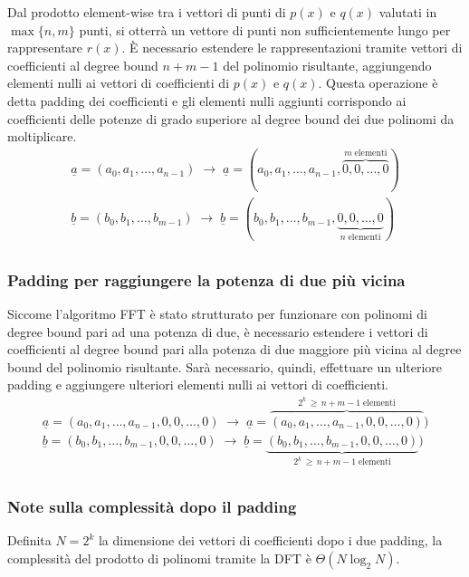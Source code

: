 Dal prodotto element-wise tra i vettori di punti di \(p(x)\) e \(q(x)\) valutati in \(\max\{n, m\}\) punti, si otterrà un
vettore di punti non sufficientemente lungo per rappresentare \(r(x)\). È necessario estendere le rappresentazioni tramite
vettori di coefficienti al degree bound \(n + m - 1\) del polinomio risultante, aggiungendo elementi nulli ai vettori di
coefficienti di \(p(x)\) e \(q(x)\). Questa operazione è detta padding dei coefficienti e gli elementi nulli aggiunti
corrispondo ai coefficienti delle potenze di grado superiore al degree bound dei due polinomi da moltiplicare.
\vspace{-5pt}
\begin{align*}
	\underline{a} = (a_0, a_1, \dots, a_{n-1}) \; \rightarrow \; \underline{a} = (a_0, a_1, \dots, a_{n-1}, \overbrace{0, 0, \dots, 0}^{m \; \text{elementi}}) \\
	\underline{b} = (b_0, b_1, \dots, b_{m-1}) \; \rightarrow \; \underline{b} = (b_0, b_1, \dots, b_{m-1}, \underbrace{0, 0, \dots, 0}_{n \; \text{elementi}}) \\
\end{align*}
\vspace{-33pt}

\subsubsection*{Padding per raggiungere la potenza di due più vicina}
Siccome l'algoritmo FFT è stato strutturato per funzionare con polinomi di degree bound pari ad una potenza di due,
è necessario estendere i vettori di coefficienti al degree bound pari alla potenza di due maggiore più vicina al degree
bound del polinomio risultante. Sarà necessario, quindi, effettuare un ulteriore padding e aggiungere ulteriori elementi
nulli ai vettori di coefficienti.
\begin{align*}
	\underline{a} = (a_0, a_1, \dots, a_{n-1}, 0, 0, \dots, 0) \; \rightarrow \; \underline{a} = \overbrace{(a_0, a_1, \dots, a_{n-1}, 0, 0, \dots, 0)}^{2^k \, \geq \, n + m - 1 \; \text{elementi}}) \\
	\underline{b} = (b_0, b_1, \dots, b_{m-1}, 0, 0, \dots, 0) \; \rightarrow \; \underline{b} = \underbrace{(b_0, b_1, \dots, b_{m-1}, 0, 0, \dots, 0)}_{2^k \, \geq \, n + m - 1 \; \text{elementi}}) \\
\end{align*}
\vspace{-33pt}

\subsubsection*{Note sulla complessità dopo il padding}
Definita \(N = 2^k\) la dimensione dei vettori di coefficienti dopo i due padding, la complessità del prodotto di polinomi
tramite la DFT è \(\Theta(N \log_2 N)\).

